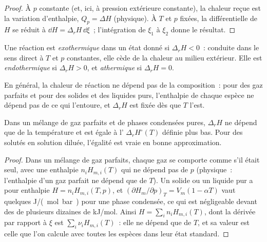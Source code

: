 \begin{proof}
À $p$ constante (et, ici, à pression extérieure constante), la chaleur reçue
est la variation d'enthalpie, $Q_p = \Delta H$ (physique). À $T$ et $p$ fixées,
la différentielle de $H$ se réduit à $\dd H = \Delta_r H\,\dd\xi$~; l'intégration
de $\xi_1$ à $\xi_2$ donne le résultat.
\end{proof}

\begin{definition}\label{def:b2:reaction-enthalpy:exothermic}
Une réaction est \emph{exothermique} dans un état donné si
$\Delta_r H < 0$~: conduite dans le sens direct à $T$ et $p$ constantes, elle cède de la chaleur au
milieu extérieur. Elle est \emph{endothermique} si $\Delta_r H >
0$, et \emph{athermique} si $\Delta_r H = 0$.
\end{definition}

En général, la chaleur de réaction ne dépend pas de la composition~:
pour des gaz parfaits et pour des solides et des liquides purs, l'enthalpie
de chaque espèce ne dépend pas de ce qui l'entoure, et $\Delta_r H$ est fixée
dès que $T$ l'est.

\begin{proposition}\label{prop:b2:reaction-enthalpy:ideal}
Dans un mélange de gaz parfaits et de phases condensées pures, $\Delta_r H$
ne dépend que de la température et est égale à l' $\Delta_r H^\circ(T)$ définie plus bas. Pour des solutés en solution
diluée, l'égalité est vraie en bonne approximation.
\end{proposition}

\begin{proof}
Dans un mélange de gaz parfaits, chaque gaz se comporte comme s'il était seul, avec une enthalpie
$n_iH_{m,i}(T)$ qui ne dépend pas de $p$ (physique~: l'enthalpie d'un
gaz parfait ne dépend que de $T$). Un solide ou un liquide pur a pour enthalpie $H = n_iH_{m,i}(T,
p)$, et $(\partial H_m/\partial p)_T = V_m(1 - \alpha T)$ vaut quelques
\unit{J/(mol.bar)} pour une phase condensée, ce qui est négligeable devant des  de plusieurs dizaines de \unit{kJ/mol}. Ainsi $H = \sum_in_iH_{m,i}(T)$, dont la
dérivée par rapport à $\xi$ est $\sum_i\nu_iH_{m,i}(T)$~: elle ne dépend que de
$T$, et sa valeur est celle que l'on calcule avec toutes les espèces dans leur
état standard.
\end{proof}

